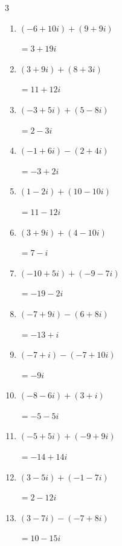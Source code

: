 \begin{multicols}{3}
\begin{enumerate}
  \item $\displaystyle (-6+10i) + (9+9i)$

        $\displaystyle =3+19i$

  \item $\displaystyle (3+9i) + (8+3i)$

        $\displaystyle =11+12i$

  \item $\displaystyle (-3+5i) + (5-8i)$

        $\displaystyle =2-3i$

  \item $\displaystyle (-1+6i) - (2+4i)$

        $\displaystyle =-3+2i$

  \item $\displaystyle (1-2i) + (10-10i)$

        $\displaystyle =11-12i$

  \item $\displaystyle (3+9i) + (4-10i)$

        $\displaystyle =7-i$

  \item $\displaystyle (-10+5i) + (-9-7i)$

        $\displaystyle =-19-2i$

  \item $\displaystyle (-7+9i) - (6+8i)$

        $\displaystyle =-13+i$

  \item $\displaystyle (-7+i) - (-7+10i)$

        $\displaystyle =-9i$

\columnbreak %

\resetques

  \item $\displaystyle (-8-6i) + (3+i)$

        $\displaystyle =-5-5i$

  \item $\displaystyle (-5+5i) + (-9+9i)$

        $\displaystyle =-14+14i$

  \item $\displaystyle (3-5i) + (-1-7i)$

        $\displaystyle =2-12i$

  \item $\displaystyle (3-7i) - (-7+8i)$

        $\displaystyle =10-15i$


\end{enumerate}
\end{multicols}
